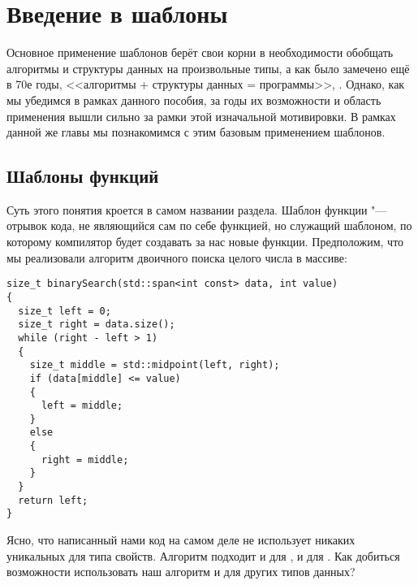 \chapter{Введение в шаблоны}
Основное применение шаблонов берёт свои корни в необходимости обобщать алгоритмы и структуры данных на произвольные типы, а как было замечено ещё в 70е годы, <<алгоритмы + структуры данных = программы>>, \cite{Wirth1976}.
Однако, как мы убедимся в рамках данного пособия, за годы их возможности и область применения вышли сильно за рамки этой изначальной мотивировки.
В рамках данной же главы мы познакомимся с этим базовым применением шаблонов.

\section{Шаблоны функций}
\label{ch1.functionTemplates}
Суть этого понятия кроется в самом названии раздела.
Шаблон функции "--- отрывок кода, не являющийся сам по себе функцией, но служащий шаблоном, по которому компилятор будет создавать за нас новые функции.
Предположим, что мы реализовали алгоритм двоичного поиска целого числа в массиве:
\begin{verbatim}
size_t binarySearch(std::span<int const> data, int value)
{
  size_t left = 0;
  size_t right = data.size();
  while (right - left > 1)
  {
    size_t middle = std::midpoint(left, right);
    if (data[middle] <= value)
    {
      left = middle;
    }
    else
    {
      right = middle;
    }
  }
  return left;
}
\end{verbatim}
Ясно, что написанный нами код на самом деле не использует никаких уникальных для типа  свойств.
Алгоритм подходит и для , и для .
Как добиться возможности использовать наш алгоритм и для других типов данных?


